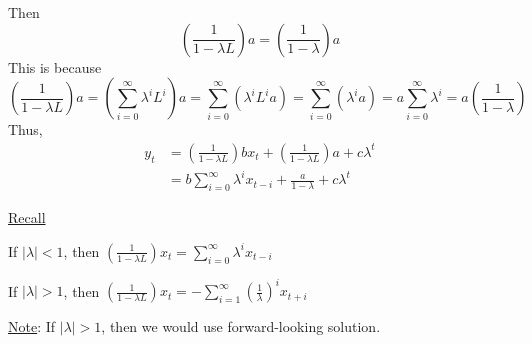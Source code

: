 \documentclass[twoside]{article}
\begin{document}
Then
\begin{equation}
   ( \frac{1}{1- \lambda L})a = (\frac{1}{1- \lambda})a
\end{equation}
This is because
\begin{equation}
    ( \frac{1}{1- \lambda L})a = (\sum_{i=0}^{\infty} \lambda^{i}L^{i})a = \sum_{i=0}^{\infty} (\lambda^{i}L^{i}a) = \sum_{i=0}^{\infty} (\lambda^{i}a) = a \sum_{i=0}^{\infty} \lambda^{i} = a(\frac{1}{1- \lambda})
\end{equation}
Thus, 
\begin{equation}
\begin{aligned}
    y_t &= (\frac{1}{1- \lambda L})b x_{t} + (\frac{1}{1- \lambda L}) a + c \lambda^t\\
        &= b \sum_{i=0}^{\infty} \lambda^i x_{t-i} + \frac{a}{1- \lambda} + c \lambda^t
\end{aligned}
\end{equation}

\underline{Recall}

If $|\lambda|<1$, then $(\frac{1}{1- \lambda L}) x_{t} = \sum_{i=0}^{\infty} \lambda^i x_{t-i}$

If $|\lambda|>1$, then $(\frac{1}{1- \lambda L}) x_{t} = -\sum_{i=1}^{\infty} {(\frac{1}{\lambda})}^i x_{t+i}$

\underline{Note}: If $|\lambda| > 1$, then we would use forward-looking solution.
\end{document}
